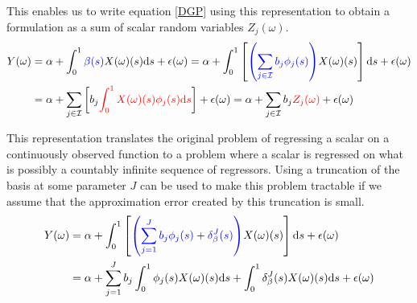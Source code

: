 \documentclass[11pt,twoside,a4paper]{article}
\begin{document}
	This enables us to write equation \ref{DGP} using this representation to obtain a formulation as a sum of scalar random variables $Z_j(\omega)$.
	\begin{equation}
		\begin{split}
			Y(\omega) & = \alpha + \int_{0}^{1} {\color{blue}\beta(s)} X(\omega)(s)\mathrm{d}s + \epsilon(\omega)
			= \alpha + \int_{0}^{1}\left[{\color{blue}\left(\sum_{j \in \mathcal{I}} b_j \phi_j(s)\right)} X(\omega)(s) \right]\mathrm{d}s + \epsilon(\omega) \\
			& = \alpha + \sum_{j \in \mathcal{I}} \left[b_j \textcolor{red}{\int_{0}^{1} X(\omega)(s) \phi_j(s)\mathrm{d}s}\right] + \epsilon(\omega)
		      = \alpha + \sum_{j \in \mathcal{I}} b_j \textcolor{red}{Z_j(\omega)} + \epsilon(\omega)
		\end{split}
	\end{equation}
	
	This representation translates the original problem of regressing a scalar on a continuously observed function to a problem where a scalar is regressed on what is possibly a countably infinite sequence of regressors. Using a truncation of the basis at some parameter $J$ can be used to make this problem tractable if we assume that the approximation error created by this truncation is small.
	\begin{equation}
		\begin{split}
			Y(\omega) & = \alpha + \int_{0}^{1}\left[{\color{blue}\left(\sum_{j = 1}^{J} b_j \phi_j(s) + \delta_{\beta}^{J}(s)\right)} X(\omega)(s) \right]\mathrm{d}s + \epsilon(\omega) \\
			& = \alpha + \sum_{j = 1}^{J} b_j \int_{0}^{1} \phi_j(s) X(\omega)(s) \mathrm{d}s +  \int_{0}^{1} \delta_{\beta}^{J}(s) X(\omega)(s) \mathrm{d}s + \epsilon(\omega)
		\end{split}
	\end{equation}
\end{document}
